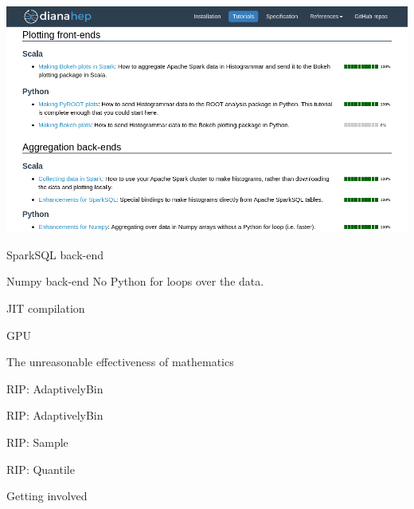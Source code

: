 \documentclass[aspectratio=169]{beamer}
\begin{document}
\begin{frame}{}
\hspace{-1 cm}\mbox{\includegraphics[width=16 cm]{tutorials.png}\hspace{-5 cm}}

\vspace{-7.5 cm}
\hfill {} \hspace{-1 cm}
\vspace{7.5 cm}
\end{frame}

\begin{frame}{SparkSQL back-end}
\end{frame}

\begin{frame}{Numpy back-end}
No Python for loops over the data.
\end{frame}

\begin{frame}{JIT compilation}
\end{frame}

\begin{frame}{GPU}
\end{frame}

\begin{frame}{The unreasonable effectiveness of mathematics}
\end{frame}

\begin{frame}{RIP: AdaptivelyBin}
\end{frame}

\begin{frame}{RIP: AdaptivelyBin}
\end{frame}

\begin{frame}{RIP: Sample}
\end{frame}

\begin{frame}{RIP: Quantile}
\end{frame}

\begin{frame}{Getting involved}
\end{frame}
\end{document}
